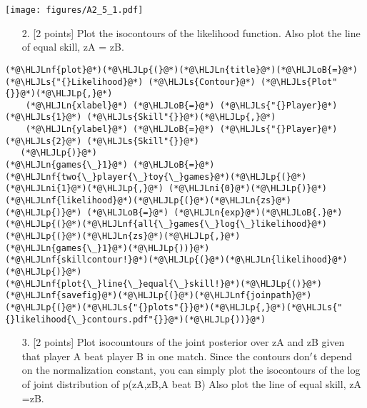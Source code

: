 \documentclass[12pt,a4paper]{article}
\newcommand{\HLJLn}[1]{#1}
\newcommand{\HLJLnf}[1]{\textcolor[RGB]{66,102,213}{#1}}
\newcommand{\HLJLs}[1]{\textcolor[RGB]{201,61,57}{#1}}
\newcommand{\HLJLni}[1]{\textcolor[RGB]{59,151,46}{#1}}
\newcommand{\HLJLoB}[1]{\textcolor[RGB]{102,102,102}{\textbf{#1}}}
\newcommand{\HLJLp}[1]{#1}
\begin{document}
\texttt{[image: figures/A2\_5\_1.pdf]}

\begin{itemize}
\item[2. ] [2 points] Plot the isocontours of the likelihood function. Also plot the line of equal skill, zA = zB.

\end{itemize}

\begin{lstlisting}
(*@\HLJLnf{plot}@*)(*@\HLJLp{(}@*)(*@\HLJLn{title}@*)(*@\HLJLoB{=}@*)(*@\HLJLs{"{}Likelihood}@*) (*@\HLJLs{Contour}@*) (*@\HLJLs{Plot"{}}@*)(*@\HLJLp{,}@*)
    (*@\HLJLn{xlabel}@*) (*@\HLJLoB{=}@*) (*@\HLJLs{"{}Player}@*) (*@\HLJLs{1}@*) (*@\HLJLs{Skill"{}}@*)(*@\HLJLp{,}@*)
    (*@\HLJLn{ylabel}@*) (*@\HLJLoB{=}@*) (*@\HLJLs{"{}Player}@*) (*@\HLJLs{2}@*) (*@\HLJLs{Skill"{}}@*)
   (*@\HLJLp{)}@*)
(*@\HLJLn{games{\_}1}@*) (*@\HLJLoB{=}@*) (*@\HLJLnf{two{\_}player{\_}toy{\_}games}@*)(*@\HLJLp{(}@*)(*@\HLJLni{1}@*)(*@\HLJLp{,}@*) (*@\HLJLni{0}@*)(*@\HLJLp{)}@*)
(*@\HLJLnf{likelihood}@*)(*@\HLJLp{(}@*)(*@\HLJLn{zs}@*)(*@\HLJLp{)}@*) (*@\HLJLoB{=}@*) (*@\HLJLn{exp}@*)(*@\HLJLoB{.}@*)(*@\HLJLp{(}@*)(*@\HLJLnf{all{\_}games{\_}log{\_}likelihood}@*)(*@\HLJLp{(}@*)(*@\HLJLn{zs}@*)(*@\HLJLp{,}@*) (*@\HLJLn{games{\_}1}@*)(*@\HLJLp{))}@*)
(*@\HLJLnf{skillcontour!}@*)(*@\HLJLp{(}@*)(*@\HLJLn{likelihood}@*)(*@\HLJLp{)}@*)
(*@\HLJLnf{plot{\_}line{\_}equal{\_}skill!}@*)(*@\HLJLp{()}@*)
(*@\HLJLnf{savefig}@*)(*@\HLJLp{(}@*)(*@\HLJLnf{joinpath}@*)(*@\HLJLp{(}@*)(*@\HLJLs{"{}plots"{}}@*)(*@\HLJLp{,}@*)(*@\HLJLs{"{}likelihood{\_}contours.pdf"{}}@*)(*@\HLJLp{))}@*)
\end{lstlisting}


\begin{itemize}
\item[3. ] [2 points] Plot isocountours of the joint posterior over zA and zB given that player A beat player B in one match. Since the contours don\ensuremath{\rq}t depend on the normalization constant, you can simply plot the isocontours of the log of joint distribution of p(zA,zB,A beat B) Also plot the line of equal skill, zA =zB.

\end{itemize}
\end{document}
